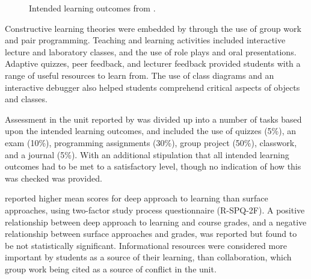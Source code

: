 \begin{figure}[htpb]
	\centering 
	\caption{Intended learning outcomes from \citet{Thota:2010}.}
	\label{fig:thota_ilos}
\end{figure}

Constructive learning theories were embedded by \citet{Thota:2010} through the use of group work and pair programming. Teaching and learning activities included interactive lecture and laboratory classes, and the use of role plays and oral presentations. Adaptive quizzes, peer feedback, and lecturer feedback provided students with a range of useful resources to learn from. The use of class diagrams and an interactive debugger also helped students comprehend critical aspects of objects and classes.

Assessment in the unit reported by \citet{Thota:2010} was divided up into a number of tasks based upon the intended learning outcomes, and included the use of quizzes (5\%), an exam (10\%), programming assignments (30\%), group project (50\%), classwork, and a journal (5\%). With an additional stipulation that all intended learning outcomes had to be met to a satisfactory level, though no indication of how this was checked was provided. 

\citet{Thota:2010} reported higher mean scores for deep approach to learning than surface approaches, using \citet{Biggs:2001} two-factor study process questionnaire (R-SPQ-2F). A positive relationship between deep approach to learning and course grades, and a negative relationship between surface approaches and grades, was reported but found to be not statistically significant. Informational resources were considered more important by students as a source of their learning, than collaboration, which group work being cited as a source of conflict in the unit.

